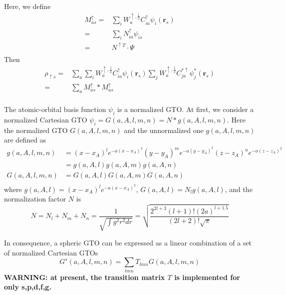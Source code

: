 \documentclass[a4paper,12pt]{article}
\begin{document}
Here, we define
\begin{equation}
	\begin{split}
	M_{as}^{\uparrow}=&\sum_{i}W_{a}^{\uparrow,\frac{1}{2}}C_{ia}^{\uparrow}\psi_{i}(\textbf{r}_s)\\
	                 =&\sum_{i}N_{ia}^{\uparrow}\psi_{is}\\
	                 =&N^{\uparrow T}\cdot \Psi\\
	\end{split}
\end{equation}
Then
\begin{equation}
	\begin{split}
		\rho_{\uparrow s}
		= &\sum_{a}\sum_{i}W_{a}^{\uparrow,\frac{1}{2}}C_{ia}^{\uparrow}\psi_i(\textbf{r}_s)
	    	\sum_{j}W_{a}^{\uparrow,\frac{1}{2}}C_{ja}^{*\uparrow}\psi_j^*(\textbf{r}_s)\\
			= &\sum_{a}M_{as}^{\uparrow} * M_{as}^{\uparrow}\\
	\end{split}
\end{equation}

The atomic-orbital basis function $\psi_i$ is a normalized GTO. At first, we consider a normalized Cartesian GTO 
$\psi_i = G(a,A,l,m,n) = N*g(a,A,l,m,n)$. Here the normalized GTO $G(a,A,l,m,n)$ and the unnormalized one $g(a,A,l,m,n)$ are defined as 
\begin{equation}
	\begin{split}
	    g(a,A,l,m,n) &= (x-x_{A})^{l}e^{-a (x-x_{A})^2}(y-y_{A})^{m}e^{-a (y-y_{A})^2}(z-z_{A})^{n}e^{-a (z-z_{A})^2}\\
	                 &= g(a,A,l)g(a,A,m)g(a,A,n)\\
	    G(a,A,l,m,n) &= G(a,A,l)G(a,A,m)G(a,A,n)\\
	\end{split}
\end{equation}
where  $g(a,A,l) = (x-x_{A})^{l} e^{-a (x-x_{A})^2}$, $G(a,A,l)=N_l g(a,A,l)$, and the normalization factor $N$ is
\begin{equation}
	N = N_{l}+N_{m}+N_{n}=\frac{1}{\sqrt{\int g^2 r^2 dr}}
    = \sqrt{\frac{2^{2l+3} (l+1)! (2a)^{l+1.5}}{(2l+2)!\sqrt{\pi}}}
\end{equation}

In consequence, a spheric GTO can be expressed as a linear combination of a set of normalized Cartesian GTOs
\begin{equation}
	G^{s}(a,A,l,m,n)=\sum_{lmn}T_{lmn}G(a,A,l,m,n)
\end{equation}
\textbf{WARNING: at present, the transition matrix $T$ is implemented for only s,p,d,f,g.}
\end{document}
